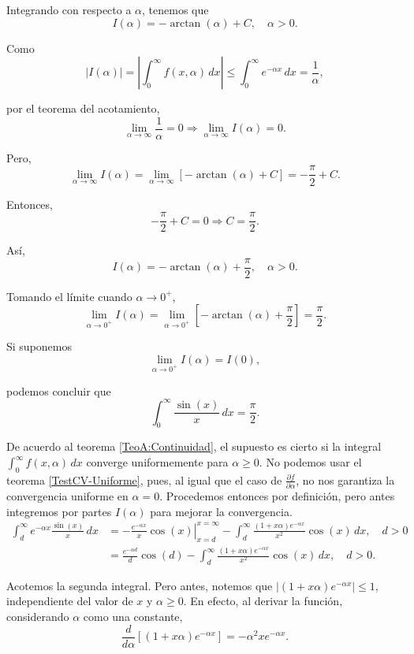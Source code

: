 \begin{ejemplo}
Integrando con respecto a $\alpha$, tenemos que
$$I(\alpha) = - \arctan(\alpha) + C, \quad \alpha > 0.$$

Como
$$|I(\alpha)| = \left| \int_0^{\infty} f(x,\alpha) \,dx \right| \leq \int_0^{\infty} e^{-\alpha x} \,dx = \frac{1}{\alpha},$$

por el teorema del acotamiento, 
$$\lim_{\alpha \to \infty} \frac{1}{\alpha} = 0 \Rightarrow \lim_{\alpha \to \infty} I(\alpha) = 0.$$

Pero,
$$\lim_{\alpha \to \infty} I(\alpha) = \lim_{\alpha \to \infty} [- \arctan(\alpha) + C] = - \frac{\pi}{2} + C.$$

Entonces,
$$-\frac{\pi}{2} + C = 0 \Rightarrow C = \frac{\pi}{2}.$$

Así,
$$I(\alpha) = - \arctan(\alpha) + \frac{\pi}{2}, \quad \alpha > 0.$$

Tomando el límite cuando $\alpha \to 0^+$,
$$\lim_{\alpha \to 0^+} I(\alpha) = \lim_{\alpha \to 0^+} \left[-\arctan(\alpha) + \frac{\pi}{2} \right] = \frac{\pi}{2}.$$

Si suponemos
$$\lim_{\alpha \to 0^+}I(\alpha) = I(0),$$

podemos concluir que 
$$\int_0^{\infty} \frac{\sin(x)}{x} \,dx = \frac{\pi}{2}.$$

De acuerdo al teorema \eqref{TeoA:Continuidad}, el supuesto es cierto si la integral $\int_0^{\infty} f(x,\alpha) \,dx$ converge uniformemente para $\alpha \geq 0$. No podemos usar el teorema \ref{TestCV-Uniforme}, pues, al igual que el caso de $\frac{\partial f}{\partial \alpha}$, no nos garantiza la convergencia uniforme en $\alpha = 0$. Procedemos entonces por definición, pero antes integremos por partes $I(\alpha)$ para mejorar la convergencia.
\begin{align*}
\int_{d}^{\infty} e^{-\alpha x} \frac{\sin(x)}{x} \,dx &= \left. - \frac{e^{-\alpha x}}{x} \cos(x) \right|_{x = d}^{x = \infty} - \int_d^{\infty} \frac{(1+x\alpha) e^{-\alpha x}}{x^2} \cos(x) \,dx, \quad d > 0 \\
&= \frac{e^{-\alpha d}}{d} \cos(d) - \int_d^{\infty} \frac{(1+x\alpha) e^{-\alpha x}}{x^2} \cos(x) \,dx, \quad d > 0.
\end{align*}

Acotemos la segunda integral. Pero antes, notemos que $|(1+x\alpha) e^{-\alpha x}| \leq 1$, independiente del valor de $x$ y $\alpha \geq 0$. En efecto, al derivar la función, considerando $\alpha$ como una constante,
$$\frac{d}{d\alpha} \left[ (1+x\alpha) e^{-\alpha x} \right] = - \alpha^2 x e^{-\alpha x}.$$


\end{ejemplo}

